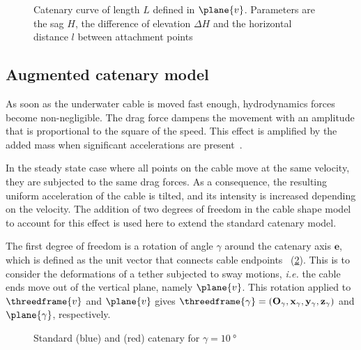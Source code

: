 \begin{figure}
	\centering
	\caption{
		Catenary curve of length $L$ defined in $\plane{v}$.
		Parameters are the sag $H$, the difference of elevation $\Delta H$ and the horizontal distance $l$ between
		attachment points
	}
	\label{cable_modelization_fig_schematic_catenary_model}
\end{figure}

\subsection{Augmented catenary model}
\label{cable_modelization_subsec_augmented_catenary_model}

As soon as the underwater cable is moved fast enough, hydrodynamics forces become non-negligible.
The drag force dampens the movement with an amplitude that is proportional to the square of the
speed. This effect is amplified by the added mass when significant accelerations are
present~\cite{fossen2011, eidsvik2018}.

In the steady state case where all points on the cable move at the same velocity, they are
subjected to the same drag forces. As a consequence, the resulting uniform acceleration of the
cable is tilted, and its intensity is increased depending on the velocity. The addition of two
degrees of freedom in the cable shape model to account for this effect is used here to extend the
standard catenary model.

The first degree of freedom is a rotation of angle $\gamma$ around the catenary axis $\mathbf{e}$,
which is defined as the unit vector that connects cable endpoints~\cite{Dru_Dun2022b}
(\cref{cable_modelization_fig_schematic_gamma_augmented_catenary}). This is to consider the
deformations of a tether subjected to sway motions, \emph{i.e.} the cable ends move out of the
vertical plane, namely $\plane{v}$. This rotation applied to $\threedframe{v}$ and $\plane{v}$
gives $\threedframe{\gamma} = (\mathbf{O}_{\gamma}, \mathbf{x}_{\gamma},\mathbf{y}_{\gamma},
	\mathbf{z}_{\gamma})$ and $\plane{\gamma}$, respectively.

\begin{figure}
	\centering
	\caption{
		Standard (blue) and \gammamodel{} (red) catenary for $\gamma = \qty{10}{\degree}$
	}
	\label{cable_modelization_fig_schematic_gamma_augmented_catenary}
\end{figure}

